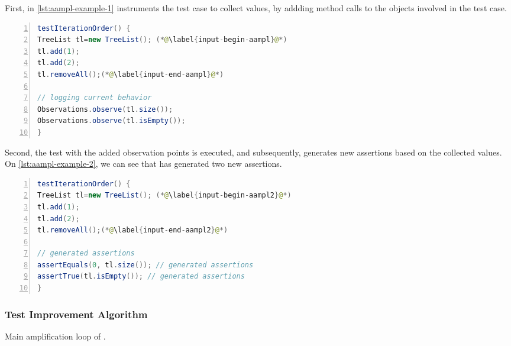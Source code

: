 First, in \autoref{lst:aampl-example-1} \dspot instruments the test case to collect values, by addding method calls to the objects involved in the test case.

\begin{lstlisting}[caption={In \Aampl{}, the second step is to instrument and run the test to collect runtime values.},label=lst:aampl-example-1,float,language=java,numbers=left] 
testIterationOrder() {
TreeList tl=new TreeList(); (*@\label{input-begin-aampl}@*)
tl.add(1);
tl.add(2);
tl.removeAll();(*@\label{input-end-aampl}@*)

// logging current behavior
Observations.observe(tl.size()); 
Observations.observe(tl.isEmpty()); 
}
\end{lstlisting}

Second, the test with the added observation points is executed, and subsequently, \dspot{} generates new assertions based on the collected values. On \autoref{lst:aampl-example-2}, we can see that \dspot has generated two new assertions.

\begin{lstlisting}[caption={In \Aampl{}, the last step is to generate the assertions based on the collected values.},label=lst:aampl-example-2,float,language=java,numbers=left] 
testIterationOrder() {
TreeList tl=new TreeList(); (*@\label{input-begin-aampl2}@*)
tl.add(1);
tl.add(2);
tl.removeAll();(*@\label{input-end-aampl2}@*)

// generated assertions
assertEquals(0, tl.size()); // generated assertions
assertTrue(tl.isEmpty()); // generated assertions
}
\end{lstlisting}

\subsubsection{Test Improvement Algorithm}
\label{subsec:algo}

\begin{algorithm}[t]
	\begin{algorithmic}[1]
		\EndFor
		\EndFor
		\EndFor
	\end{algorithmic}
	\caption{Main amplification loop of \dspot.}
	\label{algo:dspot_main}
\end{algorithm}

